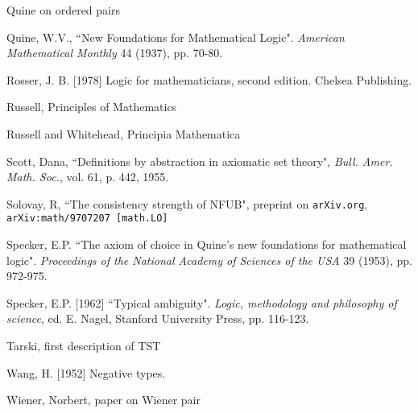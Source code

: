 \documentclass[112pt]{article}
\begin{document}
\begin{thebibliography}{99}
  Quine on ordered pairs

  Quine, W.V.,
``New Foundations for Mathematical Logic". 
{\em American Mathematical Monthly\/} 44 (1937), pp. 70-80. 

  Rosser, J. B. [1978] 
Logic for mathematicians, second edition. 
Chelsea Publishing.

  Russell, Principles of Mathematics

  Russell and Whitehead, Principia Mathematica

  Scott, Dana, ``Definitions by abstraction in axiomatic set theory",  {\em Bull. Amer. Math.
Soc.}, vol. 61, p. 442, 1955.

  Solovay, R, ``The consistency strength of NFUB",  preprint on {\tt arXiv.org}, {\tt arXiv:math/9707207 [math.LO]}

  Specker, E.P.
``The axiom of choice in Quine's new foundations for mathematical logic". 
{\em Proceedings of the National Academy of Sciences of the USA\/} 39 (1953), pp. 972-975.

  Specker, E.P. [1962] 
``Typical ambiguity". 
{\em Logic, methodology and philosophy of science\/}, ed. E. Nagel, Stanford University Press, pp. 116-123.

  Tarski, first description of TST

  Wang, H. [1952] 
Negative types.

  Wiener, Norbert, paper on Wiener pair


\end{thebibliography}
\end{document}
